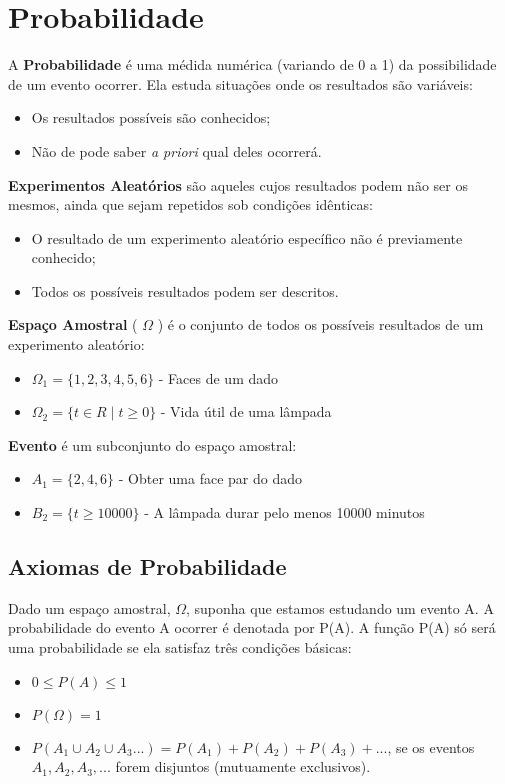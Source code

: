 \chapter{Probabilidade}

A \textbf{Probabilidade} é uma médida numérica (variando de 0 a 1) da possibilidade de um evento ocorrer. Ela estuda situações onde os resultados são variáveis:
\begin{itemize}
	\item Os resultados possíveis são conhecidos;
	\item Não de pode saber \textit{a priori} qual deles ocorrerá.
\end{itemize}

\textbf{Experimentos Aleatórios} são aqueles cujos resultados podem não ser os mesmos, ainda que sejam repetidos sob condições idênticas:
\begin{itemize}
	\item O resultado de um experimento aleatório específico não é previamente conhecido;
	\item Todos os possíveis resultados podem ser descritos.
\end{itemize}

\textbf{Espaço Amostral} ( \(\Omega\) ) é o conjunto de todos os possíveis resultados de um experimento aleatório:
\begin{itemize}
	\item \(\Omega_1 = \{ 1, 2, 3, 4, 5, 6 \} \) - Faces de um dado
	\item \(\Omega_2 = \{ t \in R \mid t \geq 0 \} \) - Vida útil de uma lâmpada
\end{itemize}

\textbf{Evento} é um subconjunto do espaço amostral:
\begin{itemize}
	\item \(A_1 = \{ 2, 4, 6 \} \) - Obter uma face par do dado
	\item \(B_2 = \{ t \geq 10000 \} \) - A lâmpada durar pelo menos 10000 minutos
\end{itemize}

\section{Axiomas de Probabilidade}

Dado um espaço amostral, \(\Omega\), suponha que estamos estudando um evento A. A
probabilidade do evento A ocorrer é denotada por P(A). A função P(A) só será uma
probabilidade se ela satisfaz três condições básicas:
\begin{itemize}
	\item \( 0 \leq P(A) \leq 1 \)
	\item \( P(\Omega) = 1 \)
	\item \( P(A_1 \cup A_2 \cup A_3...) = P(A_1)+P(A_2)+P(A_3)+...\), se os eventos \(A_1, A_2, A_3, ...\) forem disjuntos (mutuamente exclusivos).
\end{itemize}

